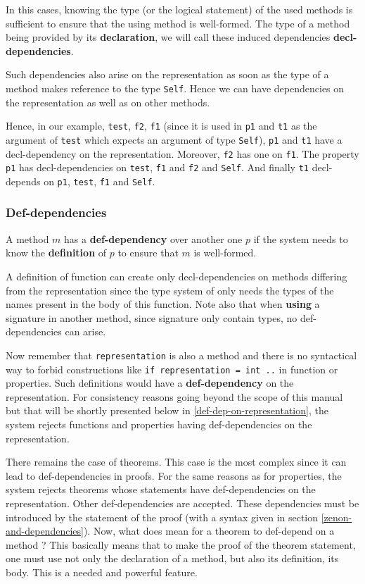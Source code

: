In this cases, knowing the type (or the logical statement) of the used
methods is sufficient to ensure that the using method is
well-formed. The type of a method being provided by its
{\bf declaration}, we will call these induced dependencies
{\bf decl-dependencies}.

Such dependencies also arise on the representation as soon as the type
of a method makes reference to the type {\tt Self}. Hence we can have
dependencies on the representation as well as on other methods.

Hence, in our example, {\tt test}, {\tt f2}, {\tt f1} (since it is
used in {\tt p1} and {\tt t1} as the argument of {\tt test} which expects
an argument of type {\tt Self}), {\tt p1} and {\tt t1} have a
decl-dependency on the representation. Moreover, {\tt f2} has one on
{\tt f1}. The property {\tt p1} has decl-dependencies on {\tt test},
{\tt f1} and {\tt f2} and {\tt Self}. And finally {\tt t1}
decl-depends on {\tt p1}, {\tt test}, {\tt f1} and {\tt Self}.



\subsubsection{Def-dependencies}
\label{def-dependency}
A method $m$ has a {\bf def-dependency} over another one $p$ if the system
needs to know the {\bf definition} of $p$ to ensure that $m$ is well-formed.

A definition of function can create only decl-dependencies on
methods differing from the representation since the type system of
{\focal} only needs the types of the names present in the body of this
function. Note also that when {\bf using} a signature in another
method, since signature only contain types, no def-dependencies can
arise.

Now remember that {\tt representation} is also a method and there is no
syntactical way to forbid constructions like {\tt if representation = int ..}
in function or properties. Such definitions would have a {\bf def-dependency}
on the representation.  For
consistency reasons going beyond the scope of this manual but that will be
shortly presented below in \ref{def-dep-on-representation}, the {\focal}
system rejects functions and properties having def-dependencies on the
representation.

\smallskip There remains the case of theorems. This case is the most
complex since it can lead to def-dependencies in proofs. For the same
reasons as for properties, the {\focal} system rejects theorems
whose statements have def-dependencies on the representation. Other
def-dependencies are accepted.  These dependencies must be introduced
by the statement of the proof (with a syntax given in section
\ref{zenon-and-dependencies}).  Now, what does mean for a theorem to
def-depend on a method ? This basically means that to make the proof
of the theorem statement, one must use not only the declaration of a
method, but also its definition, its body. This is a needed and powerful
feature.



